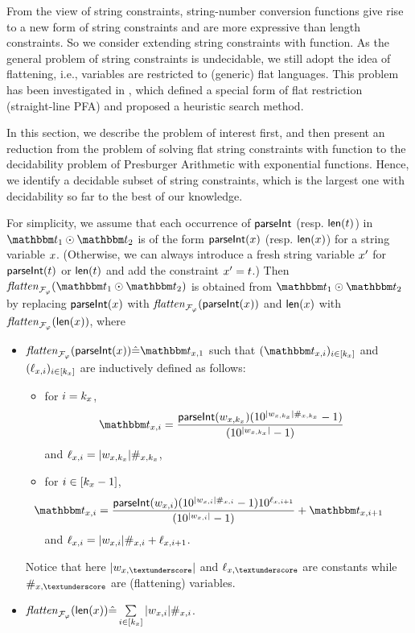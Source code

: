 {From the view of string constraints,
string-number conversion functions give rise to a new form of string constraints
and are more expressive than length constraints.
So we consider extending string constraints with 
{\parseInt} function. 
As the general problem of string constraints is undecidable,
we still adopt the idea of flattening, 
i.e., variables are restricted to (generic) flat languages.
This problem has been investigated in \cite{POPL20},
which defined a special form of flat restriction (straight-line PFA) and 
proposed a heuristic search method.

In this section, 
we describe the problem of interest first, and then 
present an reduction from the problem of solving flat string constraints with {\parseInt} function
to the decidability problem of Presburger Arithmetic with exponential functions.
Hence, we identify a decidable subset of string constraints, which is the largest one with decidability so far to the best of our knowledge.
}

For simplicity, we assume that each occurrence of $\textsf{parseInt}$ (resp. $\textsf{len}(t)$) in $\iterm_1 \op \iterm_2$ is of the form $\textsf{parseInt}(x)$ (resp. $\textsf{len}(x)$) for a string variable $x$. (Otherwise, we can always introduce a fresh string variable $x'$ for $\textsf{parseInt}(t)$ or $\textsf{len}(t)$ and add the constraint $x' = t$.)
Then $\flatten_{\flatfun_\varphi}(\iterm_1 \op \iterm_2)$ is obtained from $\iterm_1 \op \iterm_2$ by replacing $\textsf{parseInt}(x)$ with $\mathit{flatten}_{\mathcal{F}_\varphi}(\textsf{parseInt}(x))$ and $\textsf{len}(x)$ with $\mathit{flatten}_{\mathcal{F}_\varphi}(\textsf{len}(x))$, where 
\begin{itemize}
\item 
$\flatten_{\flatfun_\varphi}(\parseInt(\svarx)) \Def \iterm_{\svarx,1}$  such that $(\iterm_{\svarx, i})_{i \in [k_\svarx]}$ and $(\ell_{x, i})_{i \in [k_x]}$ are inductively defined as follows: 
\begin{itemize}
\item for $i = k_x$, 
$$ \hspace{-4mm} \iterm_{\svarx, i} = \frac{\parseInt(w_{\svarx, k_\svarx}) (10^{|w_{\svarx,k_\svarx}| \#_{\svarx, k_\svarx} } -1 )}{(10^{|w_{\svarx, k_\svarx}|} -1 )}$$ 
and $\ell_{x, i} = |w_{x,k_x}| \#_{x, k_x}$,
%
\item for $i \in [k_x-1]$, 
%
$$ \hspace{-1.2cm} \iterm_{\svarx, i} =  \frac{\parseInt(w_{\svarx, i}) (10^{|w_{\svarx, i} | \#_{\svarx, i} } -1 ) 10^{\ell_{\svarx, i+1}}} {(10^{|w_{\svarx, i}|} -1 )} + \iterm_{\svarx, i+1}$$
%
and $\ell_{x, i} = |w_{x, i} | \#_{x, i} + \ell_{x, i+1}$.
%
\end{itemize}
Notice that here $|w_{\svarx, \textunderscore } |$ and $\ell_{\svarx, \textunderscore}$ are constants while $\#_{\svarx, \textunderscore}$ are (flattening) variables.
%
\item $\mathit{flatten}_{\mathcal{F}_\varphi}(\textsf{len}(x)) \hat{=} \sum \limits_{i \in [k_{x}]} |w_{x, i} | \#_{x, i}$. 
\end{itemize} 



